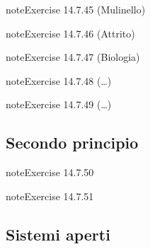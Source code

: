 \documentclass[letterpaper,10pt,italian]{jupyterBook}
\begin{document}
\begin{sphinxadmonition}{note}{Exercise 14.7.45 (Mulinello)}


\end{sphinxadmonition}
 \label{exercise:ch/thermodynamics/principles-problems-exercise-45}

\begin{sphinxadmonition}{note}{Exercise 14.7.46 (Attrito)}


\end{sphinxadmonition}
 \label{exercise:ch/thermodynamics/principles-problems-exercise-46}

\begin{sphinxadmonition}{note}{Exercise 14.7.47 (Biologia)}


\end{sphinxadmonition}
 \label{exercise:ch/thermodynamics/principles-problems-exercise-47}

\begin{sphinxadmonition}{note}{Exercise 14.7.48 (…)}


\end{sphinxadmonition}
 \label{exercise:ch/thermodynamics/principles-problems-exercise-48}

\begin{sphinxadmonition}{note}{Exercise 14.7.49 (…)}


\end{sphinxadmonition}


\subsection{Secondo principio}
\label{\detokenize{ch/thermodynamics/principles-problems:secondo-principio}} \label{exercise:ch/thermodynamics/principles-problems-exercise-49}

\begin{sphinxadmonition}{note}{Exercise 14.7.50}


\end{sphinxadmonition}
 \label{exercise:ch/thermodynamics/principles-problems-exercise-50}

\begin{sphinxadmonition}{note}{Exercise 14.7.51}


\end{sphinxadmonition}


\subsection{Sistemi aperti}
\label{\detokenize{ch/thermodynamics/principles-problems:sistemi-aperti}} \label{exercise:ch/thermodynamics/principles-problems-exercise-51}
\end{document}
